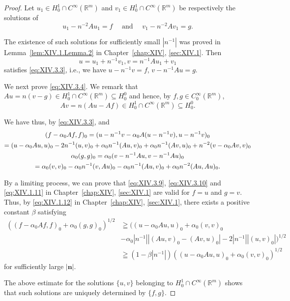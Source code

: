 \begin{proof}
Let $u_1 \in H_0^1 \cap C^\infty(\mathbb{R}^{m})$ and $v_1 \in H_0^1 \cap C^\infty(\mathbb{R}^{m})$ be respectively the solutions of 
\begin{equation}\label{eq:XIV.3.5}
u _{1} - n ^{-2} A u _{1} = f \quad \text{ and } \quad v _{1} - n ^{-2} A v _{1} = g.
\end{equation}


The existence of such solutions for sufficiently small $|n^{-1}|$ was proved in Lemma~\ref{lem:XIV.1.Lemma.2} in Chapter~\ref{chap:XIV}, \ref{sec:XIV.1}. Then 
\begin{equation}\label{eq:XIV.3.6}
u = u _{1} + n ^{-1} v _{1}, v = n ^{-1} A u _{1} + v _{1}
\end{equation}
satisfies \eqref{eq:XIV.3.3}, i.e., we have $u - n^{-1}v = f$, $v - n^{-1}Au = g$. 

We next prove \eqref{eq:XIV.3.4}. We remark that 
$A u = n (v - g) \in H_0^1 \cap C^\infty(\mathbb{R}^{m}) \subseteq H_0^0$ and hence, by $f, g \in C_0^\infty(\mathbb{R}^{m})$, 
\[
A v = n (A u - A f) \in H _{0} ^{1} \cap C ^{\infty} (\mathbb{R}^{m}) \subseteq H _{0} ^{0}.
\]

We have thus, by \eqref{eq:XIV.3.3}, 
and 
\begin{gather}(f - \alpha_{0} A f, f) _{0}  = (u - n ^{-1} v - \alpha_{0} A (u - n ^{-1} v), u - n ^{-1} v) _{0} \notag
\\= (u - \alpha_{0} A u, u) _{0} - 2 n ^{-1} (u, v) _{0} + \alpha_{0} n ^{-1} (A u, v) _{0} + \alpha_{0} n ^{-1} (A v, u) _{0} + n ^{-2} (v - \alpha_{0} A v, v) _{0} \notag
\\\alpha_{0} (g, g) _{0}  = \alpha_{0} (v - n ^{-1} A u, v - n ^{-1} A u) _{0} \notag
\\= \alpha_{0} (v, v) _{0} - \alpha_{0} n ^{-1} (v, A u) _{0} - \alpha_{0} n ^{-1} (A u, v) _{0} + \alpha_{0} n ^{-2} (A u, A u) _{0}. \notag
\end{gather}

By a limiting process, we can prove that \eqref{eq:XIV.3.9}, \eqref{eq:XIV.3.10} and \eqref{eq:XIV.1.11} in Chapter~\ref{chap:XIV}, \ref{sec:XIV.1} are valid for $f = u$ and $g = v$. Thus, by \eqref{eq:XIV.1.12} in Chapter~\ref{chap:XIV}, \ref{sec:XIV.1}, there exists a positive constant $\beta$ satisfying 
\[
\begin{aligned} ((f - \alpha_{0} A f, f) _{0} + \alpha_{0} (g, g) _{0}) ^{1/2} & \geqq ((u - \alpha_{0} A u, u) _{0} + \alpha_{0} (v, v) _{0} \\ & - \alpha_{0} | n ^{-1} | | (A u, v) _{0} - (A v, u) _{0} | - 2 | n ^{-1} | | (u, v) _{0} |) ^{1/2} \\ & \geqq (1 - \beta | n ^{-1} |) ((u - \alpha_{0} A u, u) _{0} + \alpha_{0} (v, v) _{0}) ^{1/2} \end{aligned}
\]
for sufficiently large $|\pmb{n}|$. 

The above estimate for the solutions $\{u, v\}$ belonging to $H_0^1 \cap C^\infty(\mathbb{R}^{m})$ shows that such solutions are uniquely determined by $\{f, g\}$. 
\end{proof}


